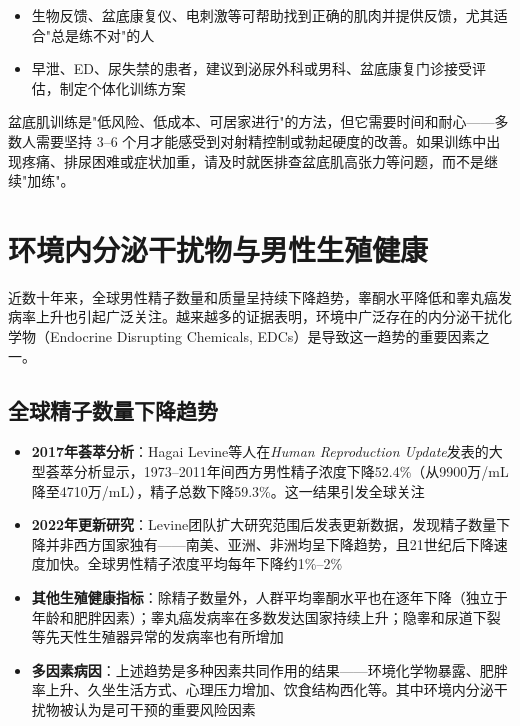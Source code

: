 \begin{itemize}[leftmargin=2cm]
	\item 生物反馈、盆底康复仪、电刺激等可帮助找到正确的肌肉并提供反馈，尤其适合"总是练不对"的人
	\item 早泄、ED、尿失禁的患者，建议到泌尿外科或男科、盆底康复门诊接受评估，制定个体化训练方案
\end{itemize}

\begin{tcolorbox}[colback=pink!5!white,colframe=red!50!black,title=贴心小叮咛]
盆底肌训练是"低风险、低成本、可居家进行"的方法，但它需要时间和耐心——多数人需要坚持 3--6 个月才能感受到对射精控制或勃起硬度的改善。如果训练中出现疼痛、排尿困难或症状加重，请及时就医排查盆底肌高张力等问题，而不是继续"加练"。
\end{tcolorbox}


\section{环境内分泌干扰物与男性生殖健康}

近数十年来，全球男性精子数量和质量呈持续下降趋势，睾酮水平降低和睾丸癌发病率上升也引起广泛关注。越来越多的证据表明，环境中广泛存在的内分泌干扰化学物（Endocrine Disrupting Chemicals, EDCs）是导致这一趋势的重要因素之一。

\subsection{全球精子数量下降趋势}

\begin{itemize}[leftmargin=2cm]
	\item \textbf{2017年荟萃分析}：Hagai Levine等人在\textit{Human Reproduction Update}发表的大型荟萃分析显示，1973--2011年间西方男性精子浓度下降52.4\%（从9900万/mL降至4710万/mL），精子总数下降59.3\%。这一结果引发全球关注
	\item \textbf{2022年更新研究}：Levine团队扩大研究范围后发表更新数据，发现精子数量下降并非西方国家独有——南美、亚洲、非洲均呈下降趋势，且21世纪后下降速度加快。全球男性精子浓度平均每年下降约1\%--2\%
	\item \textbf{其他生殖健康指标}：除精子数量外，人群平均睾酮水平也在逐年下降（独立于年龄和肥胖因素）；睾丸癌发病率在多数发达国家持续上升；隐睾和尿道下裂等先天性生殖器异常的发病率也有所增加
	\item \textbf{多因素病因}：上述趋势是多种因素共同作用的结果——环境化学物暴露、肥胖率上升、久坐生活方式、心理压力增加、饮食结构西化等。其中环境内分泌干扰物被认为是可干预的重要风险因素
\end{itemize}

